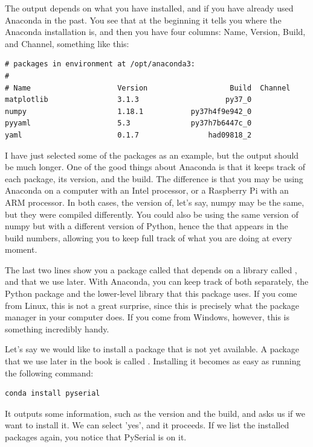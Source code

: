 The output depends on what you have installed, and if you have already used Anaconda in the past. You see that at the beginning it tells you where the Anaconda installation is, and then you have four columns: Name, Version, Build, and Channel, something like this:

\begin{verbatim}
# packages in environment at /opt/anaconda3:
#
# Name                    Version                   Build  Channel
matplotlib                3.1.3                    py37_0
numpy                     1.18.1           py37h4f9e942_0
pyyaml                    5.3              py37h7b6447c_0
yaml                      0.1.7                had09818_2
\end{verbatim}

I have just selected some of the packages as an example, but the output should be much longer. One of the good things about Anaconda is that it keeps track of each package, its version, and the build. The difference is that you may be using Anaconda on a computer with an Intel processor, or a Raspberry Pi with an ARM processor. In both cases, the version of, let's say, numpy may be the same, but they were compiled differently. You could also be using the same version of numpy but with a different version of Python, hence the  that appears in the build numbers, allowing you to keep full track of what you are doing at every moment.

The last two lines show you a package called  that depends on a library called , and that we use later. With Anaconda, you can keep track of both separately, the Python package and the lower-level library that this package uses. If you come from Linux, this is not a great surprise, since this is precisely what the package manager in your computer does. If you come from Windows, however, this is something incredibly handy.

Let's say we would like to install a package that is not yet available. A package that we use later in the book is called . Installing it becomes as easy as running the following command:

\begin{verbatim}
conda install pyserial
\end{verbatim}

It outputs some information, such as the version and the build, and asks us if we want to install it. We can select 'yes', and it proceeds. If we list the installed packages again, you notice that PySerial is on it.

